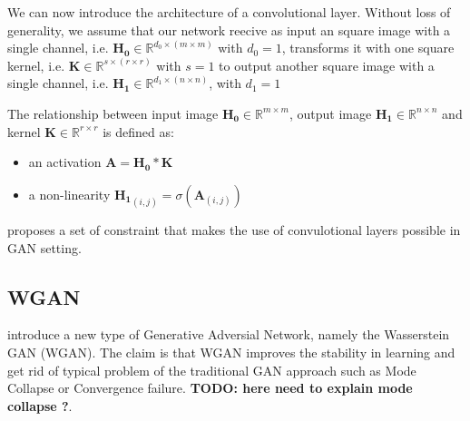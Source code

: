 \documentclass{article}
\begin{document}
We can now introduce the architecture of a convolutional layer. Without loss of generality, we assume that our network reecive as input an square image with a single channel, i.e. $\mathbf{H_0} \in \mathbb{R}^{d_0 \times (m \times m)}$ with $d_0 = 1$, transforms it with one square kernel, i.e. $\mathbf{K} \in \mathbb{R}^{s \times (r \times r)}$ with $s = 1$ to output another square image with a single channel, i.e. $\mathbf{H_1} \in \mathbb{R}^{d_1 \times (n \times n)}$, with $d_1 = 1$

The relationship between input image $\mathbf{H_0} \in \mathbb{R}^{m \times m}$, output image $\mathbf{H_1} \in \mathbb{R}^{n \times n}$ and kernel $\mathbf{K} \in \mathbb{R}^{r \times r}$ is defined as:


\begin{itemize} 
    \item an activation $\mathbf{A} = \mathbf{H_0} \ast \mathbf{K}$
    \item a non-linearity $\mathbf{H_1}_{(i,j)} = \sigma(\mathbf{A}_{(i,j)})$ 
\end{itemize}

\cite{radford2015unsupervised} proposes a set of constraint that makes the use of convulotional layers possible in GAN setting.


\subsection{WGAN}

\cite{arjovsky2017wasserstein} introduce a new type of Generative Adversial Network, namely the Wasserstein GAN (WGAN). The claim is that WGAN improves the stability in learning and get rid of typical problem of the traditional GAN approach such as Mode Collapse or Convergence failure. \textbf{TODO: here need to explain mode collapse ?}. 

\begin{comment}
More specifically, \cite{arjovsky2017wasserstein} provides the following insights:

\textbf{TODO}: Here needs to state the problem that the Earth Mover distance (distance between probability) try to solve.

\begin{itemize}
    \item Analyses how the Earth-Mover (EM) distance, also known as Wasserstein distance behaves compared to other distance between probability distribution (e.g. Kullback-Leibler distance)
    \item Define a GAN that minimizes the an approximation of the EM distance, namely the WGAN.
    \item Show that unlike traditional GANs, WGANs do not need to maintain a balance when training the discriminator and generator. Indeed in regular GAN approach, it was crucial to avoid the discriminator to become too good before the generator, since this would prevent the generator to learn any distribution. 
\end{itemize}
\end{comment}
\end{document}
